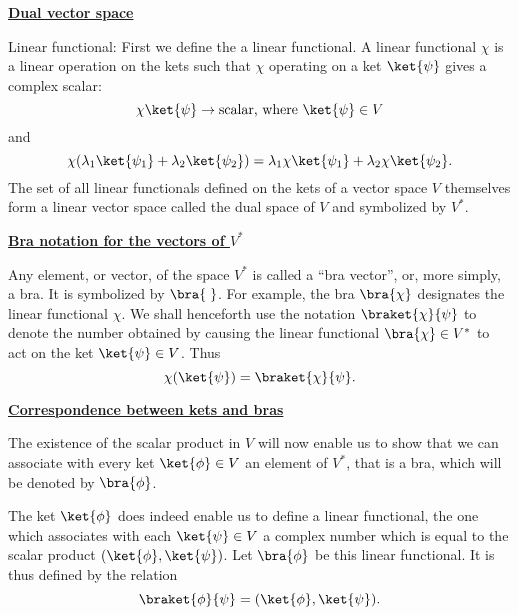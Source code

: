 \newpage

\textbf{\underline{Dual vector space}}

\vspace{1mm}

Linear functional:\newline
First we define the a linear functional. A linear functional $\chi$ is a linear operation on the kets such that $\chi$ operating on a ket $\ket{\psi}$ gives a complex scalar:
$$\chi \ket{\psi} \rightarrow \text{scalar, where } \ket{\psi} \in V$$
and
$$\chi (\lambda_1 \ket{\psi_1} + \lambda_2 \ket{\psi_2}) = \lambda_1 \chi \ket{\psi_1} + \lambda_2 \chi \ket{\psi_2}\text{.}$$
The set of all linear functionals defined on the kets of a vector space $V$ themselves form a linear vector space called the dual space of $V$ and symbolized by $V^{\ast}$.

\vspace{3mm}

\textbf{\underline{Bra notation for the vectors of $V^{\ast}$}}

\vspace{1mm}

\hspace{5mm}Any element, or vector, of the space $V^{\ast}$ is called a ``bra vector'', or, more simply, a bra. It is symbolized by $\bra{\hspace{1mm}}$. For example, the bra $\bra{\chi}$ designates the linear functional $\chi$. We shall henceforth use the notation $\braket{\chi}{\psi}$ to denote the number obtained by causing the linear functional $\bra{\chi} \in V^\ast$ to act on the ket $\ket{\psi} \in V$. Thus
$$\chi(\ket{\psi}) = \braket{\chi}{\psi}\text{.}$$




\textbf{\underline{Correspondence between kets and bras}}

\vspace{1mm}

\hspace{5mm}The existence of the scalar product in $V$ will now enable us to show that we can associate with every ket 
$\ket{\phi} \in V$ an element of $V^\ast$, that is a bra, which will be denoted by $\bra{\phi}$.

\hspace{5mm}The ket $\ket{\phi}$ does indeed enable us to define a linear functional, the one which associates with each $\ket{\psi} \in V$ a complex number which is equal to the scalar product $(\ket{\phi},  \ket{\psi})$. Let  $\bra{\phi}$ be this linear functional. It is thus defined by the relation
$$\braket{\phi}{\psi} = (\ket{\phi}, \ket{\psi})\text{.}$$


